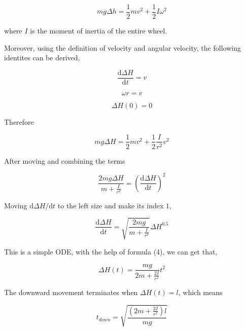 \documentclass[a4paper]{article}
\begin{document}
\begin{equation}
    mg\Delta h = \frac{1}{2}m v^2 + \frac{1}{2} I \omega ^2
\end{equation}


where $I$ is the moment of inertia of the entire wheel. 

Moreover, using the definition of velocity and angular velocity, the following identites can be derived,

\begin{equation}
    \dfrac{\mathrm{d}\Delta H}{\mathrm{d}t} = v
\end{equation}

\begin{equation}
    \omega r = v
\end{equation}

\begin{equation}
    \Delta H(0) = 0
\end{equation}

Therefore

\begin{equation}
    mg\Delta H = \frac{1}{2}m v^2 + \frac{1}{2} \frac{I}{r^2} v ^2
\end{equation}

After moving and combining the terms

\begin{equation}
    \frac{2mg\Delta H}{m+\frac{I}{r^2}} = (\dfrac{\mathrm{d}\Delta H}{\mathrm{d}t})^2
\end{equation}

Moving ${\mathrm{d}\Delta H}/{\mathrm{d}t}$ to the left size and make its index $1$,

\begin{equation}
    \dfrac{\mathrm{d}\Delta H}{\mathrm{d}t} = \sqrt{\frac{2mg}{m+\frac{I}{r^2}}} \Delta H ^ {0.5}
\end{equation}

This is a simple ODE, with the help of formula (4), we can get that,

\begin{equation}
    \Delta H(t) = \dfrac{mg}{2m+\frac{2I}{r^2}} t^2
\end{equation}

The downward movement terminates when $\Delta H(t) = l$, which means 

\begin{equation}
    t_{down} = \sqrt{\dfrac{(2m+\frac{2I}{r^2})l}{mg}}
\end{equation}
\end{document}
